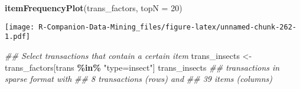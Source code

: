 \documentclass[
  notitlepage]{book}
\newenvironment{Shaded}{\begin{snugshade}}{\end{snugshade}}
\newcommand{\CommentTok}[1]{\textcolor[rgb]{0.56,0.35,0.01}{\textit{#1}}}
\newcommand{\DataTypeTok}[1]{\textcolor[rgb]{0.13,0.29,0.53}{#1}}
\newcommand{\DecValTok}[1]{\textcolor[rgb]{0.00,0.00,0.81}{#1}}
\newcommand{\KeywordTok}[1]{\textcolor[rgb]{0.13,0.29,0.53}{\textbf{#1}}}
\newcommand{\NormalTok}[1]{#1}
\newcommand{\OperatorTok}[1]{\textcolor[rgb]{0.81,0.36,0.00}{\textbf{#1}}}
\newcommand{\StringTok}[1]{\textcolor[rgb]{0.31,0.60,0.02}{#1}}
\begin{document}
\begin{Shaded}
\begin{Highlighting}[]
\KeywordTok{itemFrequencyPlot}\NormalTok{(trans\_factors, }\DataTypeTok{topN =} \DecValTok{20}\NormalTok{)}
\end{Highlighting}
\end{Shaded}

\texttt{[image: R-Companion-Data-Mining\_files/figure-latex/unnamed-chunk-262-1.pdf]}

\begin{Shaded}
\begin{Highlighting}[]
\CommentTok{\#\# Select transactions that contain a certain item}
\NormalTok{trans\_insects \textless{}{-}}\StringTok{ }\NormalTok{trans\_factors[trans }\OperatorTok{\%in\%}\StringTok{ "type=insect"}\NormalTok{]}
\NormalTok{trans\_insects}
\CommentTok{\#\# transactions in sparse format with}
\CommentTok{\#\#  8 transactions (rows) and}
\CommentTok{\#\#  39 items (columns)}
\end{Highlighting}
\end{Shaded}
\end{document}
